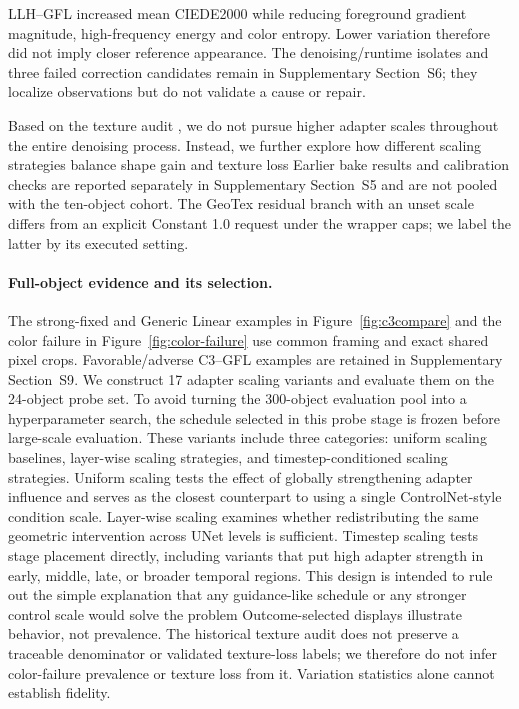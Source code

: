 \documentclass[times,twocolumn,final]{elsarticle}
\providecommand{\DIFadd}[1]{{\protect\color{blue} \sf #1}} %
\providecommand{\DIFdel}[1]{{\protect\color{red} \scriptsize #1}} %
\providecommand{\DIFaddbegin}{} %
\providecommand{\DIFaddend}{} %
\providecommand{\DIFdelbegin}{} %
\providecommand{\DIFdelend}{} %
\begin{document}
\DIFdelbegin %
\DIFdelend \DIFaddbegin \DIFadd{LLH--GFL increased mean CIEDE2000 while reducing foreground gradient magnitude, high-frequency energy and color entropy. Lower variation therefore did not imply closer reference appearance. The denoising/runtime isolates and three failed correction candidates remain in Supplementary Section~S6; they localize observations but do not validate a cause or repair.
}\DIFaddend 

\DIFdelbegin \DIFdel{Based on the texture audit , we do not pursue higher adapter scales throughout the entire denoising process. Instead, we further explore how different scaling strategies balance shape gain and texture loss }\DIFdelend \DIFaddbegin \DIFadd{Earlier bake results and calibration checks are reported separately in Supplementary Section~S5 and are not pooled with the ten-object cohort. The GeoTex residual branch with an unset scale differs from an explicit Constant 1.0 request under the wrapper caps; we label the latter by its executed setting.
}

\paragraph{Full-object evidence and its selection.}
\DIFadd{The strong-fixed and Generic Linear examples in Figure~\ref{fig:c3compare} and the color failure in Figure~\ref{fig:color-failure} use common framing and exact shared pixel crops. Favorable/adverse C3--GFL examples are retained in Supplementary Section~S9}\DIFaddend . \DIFdelbegin \DIFdel{We construct 17 adapter scaling variants and evaluate them on the 24-object probe set.
To avoid turning the 300-object evaluation pool into a hyperparameter search, the schedule selected in this probe stage is frozen before large-scale evaluation. These variants include three categories: uniform scaling baselines, layer-wise scaling strategies, and timestep-conditioned scaling strategies. Uniform scaling tests the effect of globally strengthening adapter influence and serves as the closest counterpart to using a single ControlNet-style condition scale. Layer-wise scaling examines whether redistributing the same geometric intervention across UNet levels is sufficient. Timestep scaling tests stage placement directly, including variants that put high adapter strength in early, middle, late, or broader temporal regions. This design is intended to rule out the simple explanation that any guidance-like schedule or any stronger control scale would solve the problem}\DIFdelend \DIFaddbegin \DIFadd{Outcome-selected displays illustrate behavior, not prevalence. The historical texture audit does not preserve a traceable denominator or validated texture-loss labels; we therefore do not infer color-failure prevalence or texture loss from it. Variation statistics alone cannot establish fidelity.
}
\end{document}

